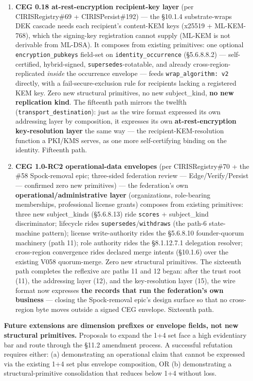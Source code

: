 \documentclass[10pt]{article}
\begin{document}
\begin{enumerate}
\item \textbf{CEG 0.18 at-rest-encryption recipient-key layer} (per CIRISRegistry\#69 + CIRISPersist\#192) — the §10.1.4 substrate-wraps DEK cascade needs each recipient's content-KEM keys (x25519 + ML-KEM-768), which the signing-key registration cannot supply (ML-KEM is not derivable from ML-DSA). It composes from existing primitives: one optional \texttt{encryption\_pubkeys} field-set on \texttt{identity\_occurrence} (§5.6.8.8.2) — self-certified, hybrid-signed, \texttt{supersedes}-rotatable, and already cross-region-replicated \textit{inside} the occurrence envelope — feeds \texttt{wrap\_algorithm: v2} directly, with a fail-secure-exclusion rule for recipients lacking a registered KEM key. Zero new structural primitives, no new subject\_kind, \textbf{no new replication kind}. The fifteenth path mirrors the twelfth (\texttt{transport\_destination}): just as the wire format expressed its own addressing layer by composition, it expresses its own \textbf{at-rest-encryption key-resolution layer} the same way — the recipient-KEM-resolution function a PKI/KMS serves, as one more self-certifying binding on the identity. Fifteenth path.
\item \textbf{CEG 1.0-RC2 operational-data envelopes} (per CIRISRegistry\#70 + the \#58 Spock-removal epic; three-sided federation review — Edge/Verify/Persist — confirmed zero new primitives) — the federation's own \textbf{operational/administrative layer} (organizations, role-bearing memberships, professional license grants) composes from existing primitives: three new subject\_kinds (§5.6.8.13) ride \texttt{scores} + subject\_kind discriminator; lifecycle rides \texttt{supersedes}/\texttt{withdraws} (the path-6 state-machine pattern); license write-authority rides the §5.6.8.10 founder-quorum machinery (path 11); role authority rides the §8.1.12.7.1 delegation resolver; cross-region convergence rides declared merge intents (§10.1.6) over the existing V058 quorum-merge. Zero new structural primitives. The sixteenth path completes the reflexive arc paths 11 and 12 began: after the trust root (11), the addressing layer (12), and the key-resolution layer (15), the wire format now expresses \textbf{the records that run the federation's own business} — closing the Spock-removal epic's design surface so that no cross-region byte moves outside a signed CEG envelope. Sixteenth path.
\end{enumerate}


\textbf{Future extensions are dimension prefixes or envelope fields, not new structural primitives.} Proposals to expand the 1+4 set face a high evidentiary bar and route through the §11.2 amendment process. A successful refutation requires either: (a) demonstrating an operational claim that cannot be expressed via the existing 1+4 set plus envelope composition, OR (b) demonstrating a structural-primitive consolidation that reduces below 1+4 without loss.
\end{document}

